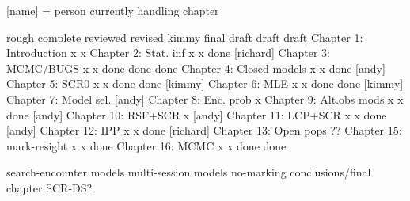 [name] = person currently handling chapter


                          rough   complete reviewed  revised kimmy       final draft
                          draft    draft
Chapter 1: Introduction       x       x
Chapter 2: Stat. inf          x       x     done    [richard]
Chapter 3: MCMC/BUGS          x       x     done     done    done
Chapter 4: Closed models      x       x     done    [andy]
Chapter 5: SCR0               x       x     done     done   [kimmy]
Chapter 6: MLE                x       x     done     done   [kimmy]
Chapter 7: Model sel.       [andy]
Chapter 8: Enc. prob          x      
Chapter 9: Alt.obs mods       x       x     done    [andy] 
Chapter 10: RSF+SCR           x    [andy]
Chapter 11: LCP+SCR           x       x     done    [andy]
Chapter 12: IPP               x       x     done    [richard]
Chapter 13: Open pops        ??
Chapter 15: mark-resight      x       x     done
Chapter 16: MCMC              x       x     done     done


search-encounter models
multi-session models
no-marking 
conclusions/final chapter
SCR-DS?



